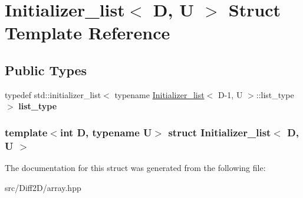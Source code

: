\hypertarget{structInitializer__list}{
\section{Initializer\_\-list$<$ D, U $>$ Struct Template Reference}
\label{structInitializer__list}
}
\subsection*{Public Types}
\begin{DoxyCompactItemize}
\item 
\hypertarget{structInitializer__list_ae28944fda227672ee3e7bac608a7b30a}{
typedef std::initializer\_\-list$<$ typename \hyperlink{structInitializer__list}{Initializer\_\-list}$<$ D-\/1, U $>$::list\_\-type $>$ {\bfseries list\_\-type}}
\label{structInitializer__list_ae28944fda227672ee3e7bac608a7b30a}

\end{DoxyCompactItemize}
\subsubsection*{template$<$int D, typename U$>$ struct Initializer\_\-list$<$ D, U $>$}



The documentation for this struct was generated from the following file:\begin{DoxyCompactItemize}
\item 
src/Diff2D/array.hpp\end{DoxyCompactItemize}
